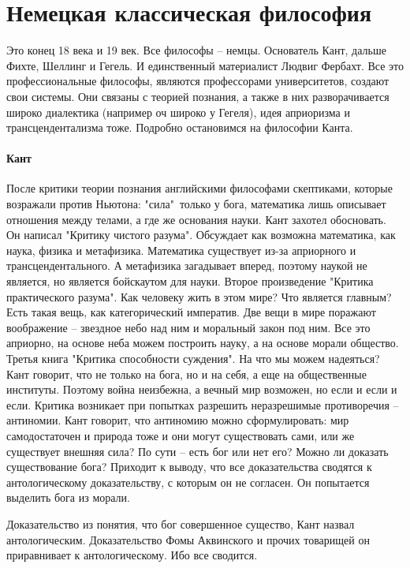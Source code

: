 \documentclass[a4paper, 12pt]{article}
\begin{document}
\section{Немецкая классическая философия}

Это конец 18 века и 19 век. Все философы -- немцы. Основатель Кант, дальше Фихте, Шеллинг и Гегель. И единственный материалист Людвиг Фербахт. Все это профессиональные философы, являются профессорами университетов, создают свои системы. Они связаны с теорией познания, а также в них разворачивается широко диалектика (например оч широко у Гегеля), идея априоризма и трансцендентализма тоже. Подробно остановимся на философии Канта. 

\paragraph{Кант}
После критики теории познания английскими философами скептиками, которые возражали против Ньютона: "сила"\ только у бога, математика лишь описывает отношения между телами, а где же основания науки. Кант захотел обосновать. Он написал "Критику чистого разума". Обсуждает как возможна математика, как наука, физика и метафизика. Математика существует из-за априорного и трансцендентального. А метафизика загадывает вперед, поэтому наукой не является, но является бойскаутом для науки. Второе произведение "Критика практического разума". Как человеку жить в этом мире? Что является главным? Есть такая вещь, как категорический императив. Две вещи в мире поражают воображение -- звездное небо над ним и моральный закон под ним. Все это априорно, на основе неба можем построить науку, а на основе морали общество. Третья книга "Критика способности суждения". На что мы можем надеяться? Кант говорит, что не только на бога, но и на себя, а еще на общественные институты. Поэтому война неизбежна, а вечный мир возможен, но если и если и если. Критика возникает при попытках разрешить неразрешимые противоречия -- антиномии. Кант говорит, что антиномию можно сформулировать: мир самодостаточен и природа тоже и они могут существовать сами, или же существует внешняя сила? По сути -- есть бог или нет его? Можно ли доказать существование бога? Приходит к выводу, что все доказательства сводятся к антологическому доказательству, с которым он не согласен. Он попытается выделить бога из морали. 

Доказательство из понятия, что бог совершенное существо, Кант назвал антологическим. Доказательство Фомы Аквинского и прочих товарищей он приравнивает к антологическому. Ибо все сводится. 
\\
\end{document}
